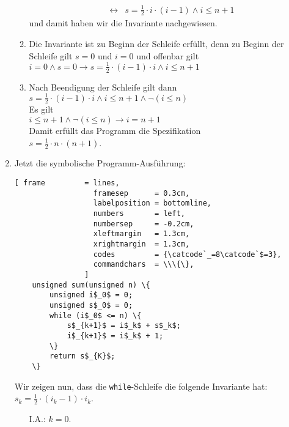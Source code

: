 \documentclass{article}
\renewcommand{\labelenumii}{\arabic{enumii}.}
\begin{document}
\begin{enumerate}
\begin{enumerate}
\begin{eqnarray*}
      & \leftrightarrow & s = \frac{1}{2} \cdot i \cdot (i-1) \wedge i \leq n + 1                         
      \end{eqnarray*}
      und damit haben wir die Invariante nachgewiesen.
\item Die Invariante ist zu Beginn der Schleife erf\"ullt, denn zu Beginn der
      Schleife gilt $s = 0$ und $i = 0$ und offenbar gilt
      \\[0.2cm]
      \hspace*{1.3cm}
      $i = 0 \wedge s = 0 \rightarrow s = \frac{1}{2} \cdot (i-1) \cdot i \wedge i \leq n + 1$
\item Nach Beendigung der Schleife gilt dann
      \\[0.2cm]
      \hspace*{1.3cm}
      $s = \frac{1}{2} \cdot (i-1) \cdot i \wedge i \leq n + 1 \wedge \neg (i \leq n)$
      \\[0.2cm]
      Es gilt 
      \\
      \hspace*{1.3cm}
      $i \leq n + 1 \wedge \neg (i \leq n) \rightarrow i = n + 1$
      \\[0.2cm]
      Damit erf\"ullt das Programm die Spezifikation
      \\[0.2cm]
      \hspace*{1.3cm}
      $s = \frac{1}{2} \cdot n \cdot (n+1)$.
\end{enumerate}
\item Jetzt die symbolische Programm-Ausf\"uhrung:
      \begin{Verbatim}[ frame         = lines, 
                  framesep      = 0.3cm, 
                  labelposition = bottomline,
                  numbers       = left,
                  numbersep     = -0.2cm,
                  xleftmargin   = 1.3cm,
                  xrightmargin  = 1.3cm,
                  codes         = {\catcode`_=8\catcode`$=3},
                  commandchars  = \\\{\},
                ]
    unsigned sum(unsigned n) \{
        unsigned i$_0$ = 0;
        unsigned s$_0$ = 0;
        while (i$_0$ <= n) \{
            s$_{k+1}$ = i$_k$ + s$_k$;
            i$_{k+1}$ = i$_k$ + 1;
        \}
        return s$_{K}$;
    \}
    \end{Verbatim} 
      Wir zeigen nun, dass die \texttt{while}-Schleife die folgende Invariante hat: 
      \\[0.2cm]
      \hspace*{1.3cm}
      $s_k = \frac{1}{2} \cdot (i_{k}-1) \cdot i_k$.
      \renewcommand{\labelenumii}{\arabic{enumii}.}
      \begin{enumerate}
      \item[I.A.:] $k=0$.


\end{enumerate}
\end{enumerate}
\end{document}
